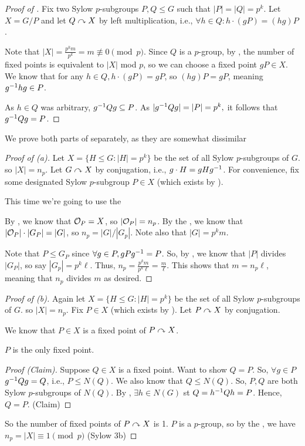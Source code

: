 \documentclass[notes.tex]{subfiles}
\begin{document}
\begin{proof}[Proof of ]
	Fix two Sylow $p$-subgroups $P, Q\le G$ such that $|P| = |Q| = p^k$.
	Let $X = G/P$ and let $Q\curvearrowright X$ by left multiplication, i.e., $\forall h\in Q: h\cdot (gP) = (hg)P$.

	Note that $|X| = \frac{p^km}{p^k} = m \not\equiv 0\pmod p$.
	Since $Q$ is a $p$-group, by , the number of fixed points is equivalent to $|X|$ mod $p$, so we can choose a fixed point $gP\in X$. We know that for any $h\in Q, h\cdot(gP) = gP$, so $(hg)P = gP$, meaning ${g}^{-1}hg\in P$.

	As $h\in Q$ was arbitrary, ${g}^{-1}Qg\subseteq P$. As $|{g}^{-1}Qg| = |P| = p^k,$ it follows that ${g}^{-1}Qg=P$.
\end{proof}

We prove both parts of  separately, as they are somewhat dissimilar
\begin{proof}[Proof of  (a)]
	Let $X = \{H\le G : |H| = p^k\}$ be the set of all Sylow $p$-subgroups of $G$. so $|X| = n_p$.
	Let $G\curvearrowright X$ by conjugation, i.e., $g\cdot H = gH{g}^{-1}$.
	For convenience, fix some designated Sylow $p$-subgroup $P\in X$ (which exists by ).

	This time we're going to use the 

	By , we know that $\mathcal{O}_P = X$, so $|\mathcal{O}_P| = n_p$. By the , we know that $|\mathcal{O}_P|\cdot|G_P| = |G|$, so $n_p = |G|/|G_p|$. Note also that $|G| = p^km$. 

	Note that $P\le G_P$ since $\forall g\in P, gP{g}^{-1} = P$.
	So, by ,
	we know that $|P|$ divides $|G_P|$, so say $|G_p| = p^k\ell.$ Thus, $n_p = \frac{p^km}{p^k\ell} = \frac{m}{\ell}$. This shows that $m = n_p\ell$, meaning that $n_p$ divides $m$ as desired.
\end{proof}

\begin{proof}[Proof of  (b)]
	Again let $X = \{H\le G : |H| = p^k\}$ be the set of all Sylow $p$-subgroups of $G$. so $|X| = n_p$.
	Fix $P\in X$ (which exists by ).
	Let $P\curvearrowright X$ by conjugation.

	We know that $P\in X$ is a fixed point of $P\curvearrowright X$.

	\begin{claim}
		$P$ is the only fixed point.
	\end{claim}
	\begin{proof}[Proof (Claim)]
		Suppose $Q\in X$ is a fixed point. Want to show $Q = P$.
		So, $\forall g\in P$ ${g}^{-1}Qg = Q$, i.e., $P \le N(Q)$.
		We also know that $Q\le N(Q)$. So, $P, Q$ are both Sylow $p$-subgroups of $N(Q)$. By , $\exists h\in N(G)$ st
		$Q = {h}^{-1}Qh = P$. Hence, $Q=P$.
		\qedhere(Claim)
	\end{proof}

	So the number of fixed points of $P\curvearrowright X$ is 1. $P$ is a $p$-group, so by the , we have $n_p = |X| \equiv 1\pmod p$ 
	\qedhere(Sylow 3b)
\end{proof}
\end{document}
